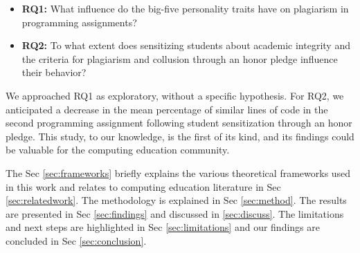 \begin{itemize}
    \item \label{RQ1} \textbf{RQ1:} What influence do the big-five personality traits have on plagiarism in programming assignments?
    \item \label{RQ2} \textbf{RQ2:} To what extent does sensitizing students about academic integrity and the criteria for plagiarism and collusion through an honor pledge influence their behavior?
\end{itemize}

We approached RQ1 as exploratory, without a specific hypothesis. For RQ2, we anticipated a decrease in the mean percentage of similar lines of code in the second programming assignment following student sensitization through an honor pledge. This study, to our knowledge, is the first of its kind, and its findings could be valuable for the computing education community. 

The Sec \ref{sec:frameworks} briefly explains the various theoretical frameworks used in this work and relates to computing education literature in Sec \ref{sec:relatedwork}. The methodology is explained in Sec \ref{sec:method}. The results are presented in Sec \ref{sec:findings} and discussed in \ref{sec:discuss}. The limitations and next steps are highlighted in Sec \ref{sec:limitations} and our findings are concluded in Sec \ref{sec:conclusion}. 
